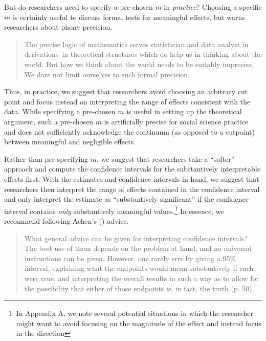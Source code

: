 \documentclass[12pt]{article}
\begin{document}
But do researchers need to specify a pre-chosen $m$ in \emph{practice}? Choosing a specific $m$ is certainly useful to discuss formal tests for meaningful effects, but \citet[pp. 101-102]{Tukey1991} warns researchers about phony precision.

\begin{quote}
The precise logic of mathematics serves statistician and data analyst in derivations--in theoretical structures which do help us in thinking about the world. But how we think about the world needs to be suitably imprecise. We dare not limit ourselves to such formal precision.
\end{quote}

\noindent Thus, in practice, we suggest that researchers avoid choosing an arbitrary cut point and focus instead on interpreting the range of effects consistent with the data. While specifying a pre-chosen $m$ is useful in setting up the theoretical argument, such a pre-chosen $m$ is artificially precise for social science practice and does not sufficiently acknowledge the continuum (as opposed to a cutpoint) between meaningful and negligible effects.

Rather than pre-specifying $m$, we suggest that researchers take a ``softer'' approach and compute the confidence intervals for the substantively interpretable effects first. With the estimates and confidence intervals in hand, we suggest that researchers then interpret the range of effects contained in the confidence interval and only interpret the estimate as ``substantively significant'' if the confidence interval contains \emph{only} substantively meaningful values.\footnote{In Appendix A, we note several potential situations in which the researcher might want to avoid focusing on the magnitude of the effect and instead focus in the direction} In essence, we recommend following Achen's (\citeyear{Achen1982}) advice.

\begin{quote}
What general advice can be given for interpreting confidence intervals? The best use of them depends on the problem at hand, and no universal instructions can be given. However, one rarely errs by giving a 95\% interval, explaining what the endpoints would mean substantively if each were true, and interpreting the overall results in such a way as to allow for the possibility that either of those endpoints is, in fact, the truth (p. 50).
\end{quote}
\end{document}
